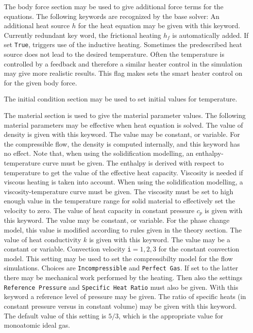 The body force section may be used to give additional force terms for the equations.
The following keywords are recognized by the base solver:
\sifbegin
{}
An additional heat source $h$ for the heat equation may be given
with this keyword.
Currently redundant key word, the frictional heating $h_f$ is automatically
added.
If set {\tt True}, triggers use of the inductive heating.
Sometimes the predescribed heat source does not lead to the desired 
temperature. Often the temperature is controlled by a feedback and therefore
a similar heater control in the simulation may give more realistic results.
This flag makes sets the smart heater control on for the given body force.
\sifend


The initial condition section may be used to set initial values for temperature.
\sifbegin
{}
\sifend

The material section is used to give the material parameter values. The
following material parameters may be effective when heat equation is solved.
\sifbegin
{}
The value of density is given with this keyword. The value may be constant,
or variable. For the compressible flow, the density is computed internally,
and this keyword has no effect.
Note that, when using the solidification modelling,
an enthalpy-temperature curve must be given. The enthalpy is derived with
respect to temperature to get the value of the effective heat capacity.
 Viscosity is needed if viscous heating 
is taken into account. When using the solidification modelling,
a viscosity-temperature curve must be given. The viscosity must be set
to high enough value in the temperature range for solid material to effectively
set the velocity to zero.
The value of heat capacity in constant pressure $c_p$ is given
with this keyword. The value may be constant,
or variable. For the phase change model, this value is modified according to
rules given in the theory section.
The value of heat conductivity $k$ is given with this keyword. The value may
be a constant or variable.
Convection velocity {\tt i}$=1,2,3$ for the constant convection model.
 This setting may be used to set the compressibilty
model for the flow simulations. Choices are {\tt Incompressible} and {\tt Perfect Gas}.
If set to the latter there may
be mechanical work performed by the heating.
Then also the settings {\tt Reference Pressure} and {\tt Specific Heat Ratio} must also be given.
 With this keyword a reference level of pressure may be given.
 The ratio of specific heats (in constant pressure
versus in constant volume) may be given with this keyword.
The default value of this setting is $5/3$, which
is the appropriate value for monoatomic ideal gas.
\sifend


